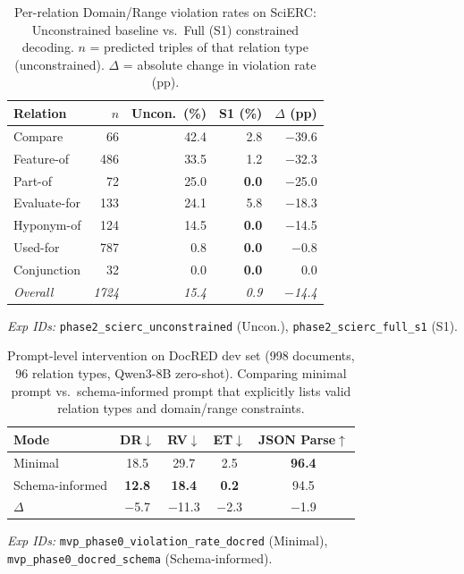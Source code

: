 \begin{table}[t]
\centering
\caption{Per-relation Domain/Range violation rates on SciERC:
Unconstrained baseline vs.\ Full (S1) constrained decoding.
$n$ = predicted triples of that relation type (unconstrained).
$\Delta$ = absolute change in violation rate (pp).}
\label{tab:scierc-per-relation-dr}
\begin{tabular}{l r rr r}
\toprule
Relation & $n$ & Uncon.\ (\%) & S1 (\%) & $\Delta$ (pp) \\
\midrule
Compare      &  66 & 42.4 &  2.8 & $-$39.6 \\
Feature-of   & 486 & 33.5 &  1.2 & $-$32.3 \\
Part-of      &  72 & 25.0 & \textbf{0.0} & $-$25.0 \\
Evaluate-for & 133 & 24.1 &  5.8 & $-$18.3 \\
Hyponym-of   & 124 & 14.5 & \textbf{0.0} & $-$14.5 \\
Used-for     & 787 &  0.8 & \textbf{0.0} & $-$0.8  \\
Conjunction  &  32 &  0.0 & \textbf{0.0} &    0.0  \\
\midrule
\textit{Overall} & \textit{1724} & \textit{15.4} & \textit{0.9} & \textit{$-$14.4} \\
\bottomrule
\end{tabular}
\vspace{2pt}
{\footnotesize
\textit{Exp IDs:}
\texttt{phase2\_scierc\_unconstrained} (Uncon.),
\texttt{phase2\_scierc\_full\_s1} (S1).
}
\end{table}


\begin{table}[t]
\centering
\caption{Prompt-level intervention on DocRED dev set (998 documents, 96 relation types, Qwen3-8B zero-shot).
Comparing minimal prompt vs.\ schema-informed prompt that explicitly lists valid relation types
and domain/range constraints.}
\label{tab:docred-phase0}
\begin{tabular}{l cccc}
\toprule
Mode & DR$\downarrow$ & RV$\downarrow$ & ET$\downarrow$ & JSON Parse$\uparrow$ \\
\midrule
Minimal          & 18.5          & 29.7          & 2.5          & \textbf{96.4} \\
Schema-informed  & \textbf{12.8} & \textbf{18.4} & \textbf{0.2} & 94.5          \\
\midrule
$\Delta$         & $-$5.7        & $-$11.3       & $-$2.3       & $-$1.9        \\
\bottomrule
\end{tabular}
\vspace{2pt}
{\footnotesize
\textit{Exp IDs:}
\texttt{mvp\_phase0\_violation\_rate\_docred} (Minimal),
\texttt{mvp\_phase0\_docred\_schema} (Schema-informed).
}
\end{table}


